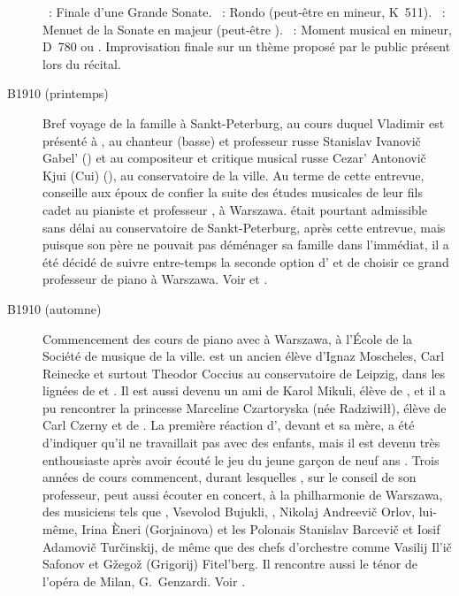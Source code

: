 \begin{description}
 \textsc{\Clementi{}}~: Finale d'une Grande Sonate.
 \textsc{\Mozart{}}~: Rondo (peut-être en \kA mineur, K~511).
 \textsc{\Beethoven{}}~: Menuet de la Sonate en \kG majeur (peut-être
 ).
 \textsc{\Schubert{}}~: Moment musical en \kF mineur, D~780  ou
 .
 Improvisation finale sur un thème proposé par le public présent lors du
 récital.
 \item[B1910 (printemps)]
 Bref voyage de la famille \Sofronitsky{} à Sankt-Peterburg, au cours duquel
 Vladimir est présenté à \AGlazounov{}, au chanteur (basse) et professeur
 russe Stanislav Ivanovič Gabel' () et au compositeur et
 critique musical russe Cezar' Antonovič Kjui (Cui) (), au
 conservatoire de la ville.
 Au terme de cette entrevue, \Glazounov{} conseille aux époux \Sofronitsky{}
 de confier la suite des études musicales de leur fils cadet au pianiste et
 professeur \AMichalowski{}, à Warszawa.
 \VSofronitsky{} était pourtant admissible sans délai au conservatoire de
 Sankt-Peterburg, après cette entrevue, mais puisque son père ne pouvait pas
 déménager sa famille dans l'immédiat, il a été décidé de suivre entre-temps
 la seconde option d'\AGlazounov{} et de choisir ce grand professeur de
 piano à Warszawa.
 Voir \citet[p.~21-22]{Sofronitsky82a} et \citet[p.~140]{Nekrasova08}.
 \item[B1910 (automne)]
 Commencement des cours de piano avec \AMichalowski{} à Warszawa, à l'École
 de la Société de musique de la ville.
 \AMichalowski{} est un ancien élève d'\hbox{Ignaz} Moscheles, Carl Reinecke
 et surtout Theodor Coccius au conservatoire de Leipzig, dans les lignées de
 \Chopin{} et \Beethoven{}.
 Il est aussi devenu un ami de Karol Mikuli, élève de \FChopin{}, et il a pu
 rencontrer la princesse Marceline Czartoryska (née Radziwiłł), élève de
 Carl Czerny et de \FChopin{}.
 La première réaction d'\AMichalowski{}, devant \VSofronitsky{} et sa mère,
 a été d'indiquer qu'il ne travaillait pas avec des enfants, mais il est
 devenu très enthousiaste après avoir écouté le jeu du jeune garçon de neuf
 ans \citep[voir][p.~140]{Nekrasova08}.
 Trois années de cours commencent, durant lesquelles \VSofronitsky{}, sur le
 conseil de son professeur, peut aussi écouter en concert, à la philharmonie
 de Warszawa, des musiciens tels que \SRachmaninov{}, Vsevolod Bujukli,
 \KIgumnov{}, Nikolaj Andreevič Orlov, \AMichalowski{} lui-même, Irina Èneri
 (Gorjainova) et les Polonais Stanislav Barcevič et Iosif Adamovič
 Turčinskij, de même que des chefs d'orchestre comme Vasilij Il'ič Safonov
 et Gžegož (Grigorij) Fitel'berg.
 Il rencontre aussi le ténor de l'opéra de Milan, G.~Genzardi.
 Voir \citet[p.~23]{Sofronitsky82a}.
\end{description}

